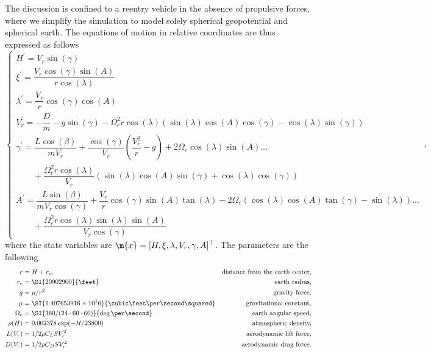 The discussion is confined to a reentry vehicle in the absence of propulsive forces, where we simplify the simulation to model solely spherical geopotential and spherical earth. The equations of motion in relative coordinates are thus expressed as follows
%
\begin{equation}
  \begin{cases}
  H^{\prime}       = V_r\sin(\gamma) \\
  \xi^{\prime}     = \dfrac{V_r\cos(\gamma) \sin(A)}{r \cos(\lambda)} \\
  \lambda^{\prime} = \dfrac{V_r}{r} \cos(\gamma) \cos(A) \\
  V_r^{\prime}     = -\dfrac{D}{m} - g\sin(\gamma) - \Omega_e^2 r \cos(\lambda)(\sin(\lambda) \cos(A) \cos(\gamma)-\cos(\lambda) \sin(\gamma)) \\
  \gamma^{\prime}  = \dfrac{L\cos(\beta)}{m V_r}+\dfrac{\cos(\gamma)}{V_r}\left(\dfrac{V_r^2}{r}-g\right) + 2\Omega_e \cos(\lambda) \sin(A)\dots \\
  \qquad + \dfrac{\Omega_e^2 r \cos(\lambda)}{V_r}(\sin(\lambda) \cos(A) \sin(\gamma)+\cos(\lambda) \cos(\gamma)) \\
  A^{\prime}       = \dfrac{L\sin(\beta)}{m V_r \cos(\gamma)}+\dfrac{V_r}{r} \cos(\gamma) \sin(A) \tan(\lambda) - 2\Omega_e(\cos(\lambda) \cos(A) \tan(\gamma) - \sin(\lambda)) \dots \\
  \qquad + \dfrac{\Omega_e^2 r \cos(\lambda) \sin(\lambda) \sin(A)}{V_r \cos(\gamma)}
  \end{cases} \, \text{,}
  \label{chap4:eq:space_shuttle_reentry}
\end{equation}
%
where the state variables are $\m{x} = [H, \xi, \lambda, V_r, \gamma, A]^\top$. The parameters are the following
%
\begin{equation*}
  \begin{aligned}
    r           & = H + r_e, & \text{distance from the earth center,} \\
    r_e         & = \SI{20902900}{\feet} & \text{earth radius,} \\
    g           & = \mu/r^2 & \text{gravity force,} \\
    \mu         & = \SI{1.407653916\times 10^16}{\cubic\feet\per\second\squared} & \text{gravitational constant,} \\
    \Omega_e    & = \SI{360/(24\cdot60\cdot60)}{\deg\per\second} & \text{earth angular speed,} \\
    \rho(H)     & = 0.002378\exp(-H/23800) & \text{atmospheric density,} \\
    L(V_r)      & = 1/2 \rho C_L S V_r^2 & \text{aerodynamic lift force,} \\
    D(V_r)      & = 1/2 \rho C_D S V_r^2 & \text{aerodynamic drag force.}
  \end{aligned}
\end{equation*}
